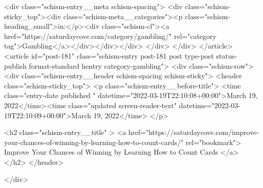 {		<div class="schism-entry__meta schism-spacing">			<div class="schism-sticky_top"><div class="schism-meta__categories"><p class="schism-heading_small">in:</p><div class="schism-cl"><a href="https://saturdaycove.com/category/gambling/" rel="category tag">Gambling</a></div></div></div>		</div>
	</div>
</article>
<article id="post-181" class="schism-entry post-181 post type-post status-publish format-standard hentry category-gambling">
	<div class="schism-row">		<div class="schism-entry__header schism-spacing schism-sticky">			<header class="schism-sticky_top">				<p class="schism-entry__before-title">
					<time class="entry-date published " datetime="2022-03-19T22:10:08+00:00">March 19, 2022</time><time class="updated screen-reader-text" datetime="2022-03-19T22:10:09+00:00">March 19, 2022</time>				</p>

				<h2 class="schism-entry__title" >
					<a href="https://saturdaycove.com/improve-your-chances-of-winning-by-learning-how-to-count-cards/" rel="bookmark">
						Improve Your Chances of Winning by Learning How to Count Cards					</a>
				</h2>
			</header>

					</div>

}
